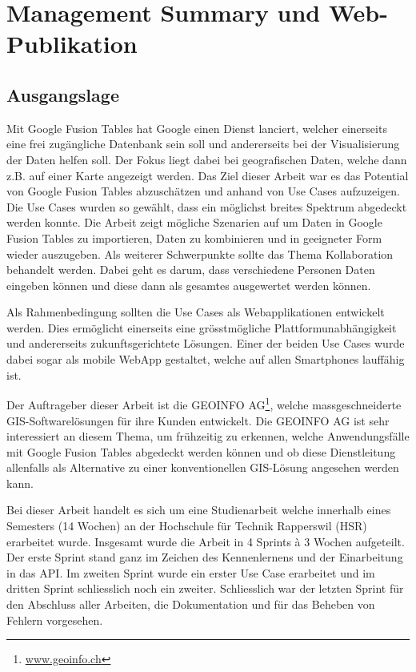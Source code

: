 \chapter*{Management Summary und Web-Publikation}
\thispagestyle{scrheadings}

\section*{Ausgangslage}
Mit Google Fusion Tables hat Google einen Dienst lanciert, welcher einerseits eine frei zugängliche Datenbank sein soll und andererseits bei der Visualisierung der Daten helfen soll. Der Fokus liegt dabei bei geografischen Daten, welche dann z.B. auf einer Karte angezeigt werden.
Das Ziel dieser Arbeit war es das Potential von Google Fusion Tables abzuschätzen und anhand von Use Cases aufzuzeigen. Die Use Cases wurden so gewählt, dass ein möglichst breites Spektrum abgedeckt werden konnte. Die Arbeit zeigt mögliche Szenarien auf um Daten in Google Fusion Tables zu importieren, Daten zu kombinieren und in geeigneter Form wieder auszugeben. Als weiterer Schwerpunkte sollte das Thema Kollaboration behandelt werden. Dabei geht es darum, dass verschiedene Personen Daten eingeben können und diese dann als gesamtes ausgewertet werden können.

Als Rahmenbedingung sollten die Use Cases als Webapplikationen entwickelt werden. Dies ermöglicht einerseits eine grösstmögliche Plattformunabhängigkeit und andererseits zukunftsgerichtete Lösungen. Einer der beiden Use Cases wurde dabei sogar als mobile WebApp gestaltet, welche auf allen Smartphones lauffähig ist.

Der Auftrageber dieser Arbeit ist die GEOINFO AG\footnote{\url{www.geoinfo.ch}}, welche massgeschneiderte \gls{GIS}-Softwarelösungen für ihre Kunden entwickelt. Die GEOINFO AG ist sehr interessiert an diesem Thema, um frühzeitig zu erkennen, welche Anwendungsfälle mit Google Fusion Tables abgedeckt werden können und ob diese Dienstleitung allenfalls als Alternative zu einer konventionellen \gls{GIS}-Lösung angesehen werden kann.

Bei dieser Arbeit handelt es sich um eine Studienarbeit welche innerhalb eines Semesters (14 Wochen) an der Hochschule für Technik Rapperswil (HSR) erarbeitet wurde. Insgesamt wurde die Arbeit in 4 Sprints à 3 Wochen aufgeteilt. Der erste Sprint stand ganz im Zeichen des Kennenlernens und der Einarbeitung in das \gls{API}. Im zweiten Sprint wurde ein erster Use Case erarbeitet und im dritten Sprint schliesslich noch ein zweiter. Schliesslich war der letzten Sprint für den Abschluss aller Arbeiten, die Dokumentation und für das Beheben von Fehlern vorgesehen.

